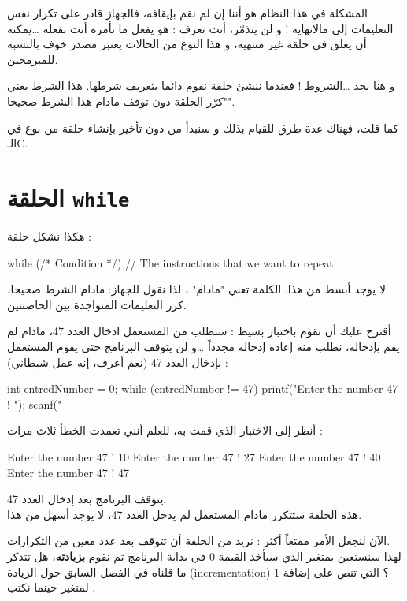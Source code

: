 المشكلة في هذا النظام هو أننا إن لم نقم بإيقافه، فالجهاز قادر على تكرار نفس التعليمات إلى مالانهاية ! و لن يتذمّر، أنت تعرف : هو يفعل ما تأمره أنت بفعله \dots يمكنه أن يعلق في حلقة غير منتهية، و هذا النوع من الحالات يعتبر مصدر خوف  بالنسبة للمبرمجين.

و هنا نجد \dots الشروط ! فعندما ننشئ حلقة نقوم دائما بتعريف شرطها. هذا الشرط يعني "كرّر الحلقة دون توقف مادام هذا الشرط صحيحا".

كما قلت، فهناك عدة طرق للقيام بذلك و سنبدأ من دون تأخير بإنشاء حلقة من نوع 
في الـ\textenglish{C}.

\section{الحلقة \texttt{while}}

هكذا نشكل حلقة 
 :

\begin{Csource}
while (/* Condition */)
{
	// The instructions that we want to repeat
}
\end{Csource}

لا يوجد أبسط من هذا. الكلمة 
تعني "مادام" ، لذا نقول للجهاز: مادام الشرط صحيحا، كرر التعليمات المتواجدة بين الحاضنتين.

أقترح عليك أن نقوم باختبار بسيط : سنطلب من المستعمل ادخال العدد 47، مادام لم يقم بإدخاله، نطلب منه إعادة إدخاله مجدداً \dots و لن يتوقف البرنامج حتى يقوم المستعمل بإدخال العدد 47 (نعم أعرف، إنه عمل شيطاني) :

\begin{Csource}
int entredNumber = 0;
while (entredNumber != 47)
{
	printf("Enter the number 47 ! ");
	scanf("%
}
\end{Csource}

أنظر إلى الاختبار الذي قمت به، للعلم أنني تعمدت الخطأ ثلاث مرات :

\begin{Console}
Enter the number 47 ! 10
Enter the number 47 ! 27
Enter the number 47 ! 40
Enter the number 47 ! 47
\end{Console}

يتوقف البرنامج بعد إدخال العدد 47.\\
 هذه الحلقة 
 ستتكرر مادام المستعمل لم يدخل العدد 47، لا يوجد أسهل من هذا.
 
الآن لنجعل الأمر ممتعاً أكثر : نريد من الحلقة أن تتوقف بعد عدد معين من التكرارات.\\
لهذا سنستعين بمتغير
الذي سيأخذ القيمة $ 0 $ في بداية البرنامج ثم نقوم 
\textbf{بزيادته}،
 هل تتذكر ما قلناه في الفصل السابق حول الزيادة 
(\textenglish{incrementation}) ؟
 التي تنص على إضافة 1 لمتغير حينما نكتب
.

